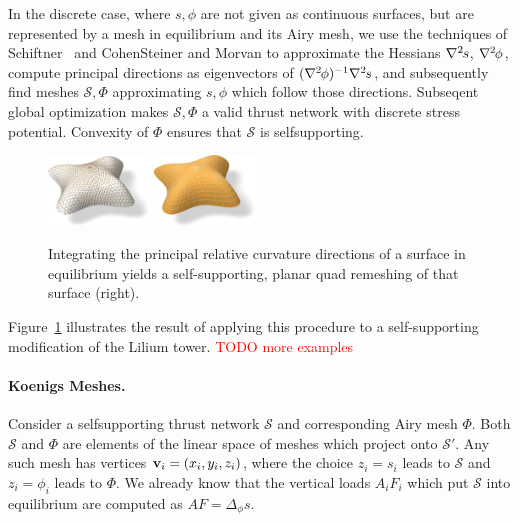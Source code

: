 \documentclass[annual]{acmsiggraph}
\def\ess{s}
\def\Hess#1{{\def\testess{#1}\nabla^2\ifx\testess\ess\!s\else #1\fi}}
\def\Hess#1{\text{$\nabla^2\hskip-.2ex #1$}}
\def\SS{{\mathcal S}}
\newcommand{\todo}[1]{\textcolor{red}{#1}}
\begin{document}
In the discrete case, where $s,\phi$ are not given as continuous surfaces,
but are represented by a mesh in equilibrium and its Airy mesh, we use the
techniques of Schiftner~ and Cohen\dash Steiner
and Morvan  to approximate the Hessians
$\Hess s$, $\Hess\phi$, compute principal directions as eigenvectors of
$(\Hess\phi)^{-1}\Hess s$, and subsequently find meshes $\SS,\Phi$
approximating $s,\phi$ which follow those directions. Subseqent global
optimization makes $\SS,\Phi$ a valid thrust network with discrete stress
potential. Convexity of $\Phi$ ensures that $\SS$ is self\dash supporting.

\begin{figure}
	\includegraphics[width=0.24\textwidth]{fig/lilium-vf.jpg}\hfill
	\includegraphics[width=0.24\textwidth]{fig/lilium-pq-n.jpg}

\caption{Integrating the principal relative curvature directions of a 
surface in equilibrium yields a self-supporting, planar quad remeshing of 
that surface (right).}
 \label{fig:lilium:pq} 
 \end{figure}

Figure~\ref{fig:lilium:pq} illustrates the result of applying this 
procedure to a self-supporting modification of the Lilium tower. 
\todo{TODO more examples}

\paragraph{Koenigs Meshes.}

Consider a self\dash supporting thrust network $\SS$ and corresponding 
Airy mesh $\Phi$. Both $\SS$ and $\Phi$ are elements of the linear space 
of meshes which project onto $\SS'$. Any such mesh has vertices 
${\mathbf v}_i=(x_i,y_i,z_i)$, where the choice $z_i=s_i$ leads to $\SS$ and 
$z_i=\phi_i$ leads to $\Phi$. We already know that the vertical loads 
$A_iF_i$ which put $\SS$ into equilibrium are computed as $AF=\Delta_\phi 
s$.
\end{document}
